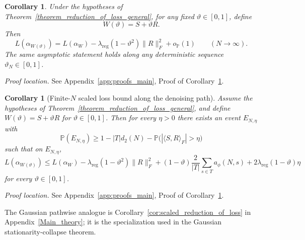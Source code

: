 \documentclass[11pt]{article}
\theoremstyle{plain}
\newtheorem{cor}[thm]{Corollary}
\theoremstyle{definition}
\theoremstyle{remark}
\newcommand{\PP}{\mathbb{P}}
\newcommand{\1}{\mathbf{1}}
\newcommand{\proofloc}[1]{\par\noindent\emph{Proof location.} #1\par}
\begin{document}
\begin{cor}
\label{cor:scaled_reduction_of_loss_general}
Under the hypotheses of Theorem~\ref{theorem_reduction_of_loss_general}, for any fixed \(\vartheta\in[0,1]\), define
\[
W(\vartheta)=S+\vartheta R.
\]
Then
\[
L(\alpha_{W(\vartheta)})
=
L(\alpha_W)-\lambda_{\mathrm{reg}}(1-\vartheta^2)\|R\|_F^2+o_{\PP}(1)
\qquad(N\to\infty).
\]
The same asymptotic statement holds along any deterministic sequence \(\vartheta_N\in[0,1]\).
\end{cor}
\proofloc{See Appendix~\ref{app:proofs_main}, Proof of Corollary~\ref{cor:scaled_reduction_of_loss_general}.}

\begin{cor}[Finite-\(N\) scaled loss bound along the denoising path]
\label{cor:scaled_reduction_of_loss_general_finiteN}
Assume the hypotheses of Theorem~\ref{theorem_reduction_of_loss_general}, and define \(W(\vartheta)=S+\vartheta R\) for \(\vartheta\in[0,1]\). Then for every \(\eta>0\) there exists an event \(E_{N,\eta}\) with
\[
\PP(E_{N,\eta})\ge 1-|T|d_2(N)-\PP\!\big(|\langle S,R\rangle_F|>\eta\big)
\]
such that on \(E_{N,\eta}\),
\[
L(\alpha_{W(\vartheta)})
\le
L(\alpha_W)
-\lambda_{\mathrm{reg}}(1-\vartheta^2)\|R\|_F^2
+(1-\vartheta)\frac{2}{|T|}\sum_{s\in T}a_\phi(N,s)
+2\lambda_{\mathrm{reg}}(1-\vartheta)\eta
\]
for every \(\vartheta\in[0,1]\).
\end{cor}
\proofloc{See Appendix~\ref{app:proofs_main}, Proof of Corollary~\ref{cor:scaled_reduction_of_loss_general_finiteN}.}

The Gaussian pathwise analogue is Corollary~\ref{cor:scaled_reduction_of_loss} in Appendix~\ref{Main_theory}; it is the specialization used in the Gaussian stationarity-collapse theorem.
\end{document}
